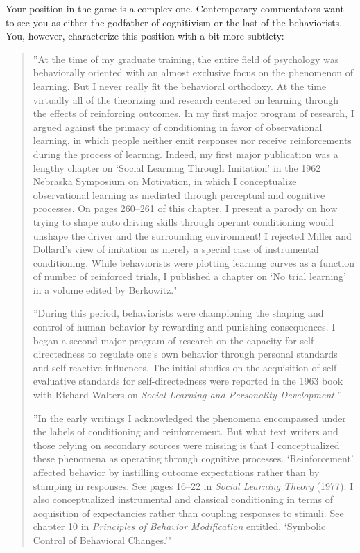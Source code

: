 \begin{refsection}
Your position in the game is a complex one. Contemporary commentators want to see you as either the godfather of cognitivism or the last of the behaviorists. You, however, characterize this position with a bit more subtlety:

\begin{quote}

”At the time of my graduate training, the entire field of psychology was behaviorally oriented with an almost exclusive focus on the phenomenon of learning. But I never really fit the behavioral orthodoxy. At the time virtually all of the theorizing and research centered on learning through the effects of reinforcing outcomes. In my first major program of research, I argued against the primacy of conditioning in favor of observational learning, in which people neither emit responses nor receive reinforcements during the process of learning. Indeed, my first major publication was a lengthy chapter on `Social Learning Through Imitation' in the 1962 Nebraska Symposium on Motivation, in which I conceptualize observational learning as mediated through perceptual and cognitive processes. On pages 260--261 of this chapter, I present a parody on how trying to shape auto driving skills through operant conditioning would unshape the driver and the surrounding environment! I rejected Miller and Dollard's view of imitation as merely a special case of instrumental conditioning. While behaviorists were plotting learning curves as a function of number of reinforced trials, I published a chapter on `No trial learning' in a volume edited by Berkowitz."

”During this period, behaviorists were championing the shaping and control of human behavior by rewarding and punishing consequences. I began a second major program of research on the capacity for self-directedness to regulate one's own behavior through personal standards and self-reactive influences. The initial studies on the acquisition of self-evaluative standards for self-directedness were reported in the 1963 book with Richard Walters on \emph{Social Learning and Personality Development.}”

”In the early writings I acknowledged the phenomena encompassed under the labels of conditioning and reinforcement. But what text writers and those relying on secondary sources were missing is that I conceptualized these phenomena as operating through cognitive processes. `Reinforcement' affected behavior by instilling outcome expectations rather than by stamping in responses. See pages 16--22 in \emph{Social Learning Theory} (1977). I also conceptualized instrumental and classical conditioning in terms of acquisition of expectancies rather than coupling responses to stimuli. See chapter 10 in \emph{Principles of Behavior Modification} entitled, `Symbolic Control of Behavioral Changes.'"


\end{quote}
\end{refsection}
